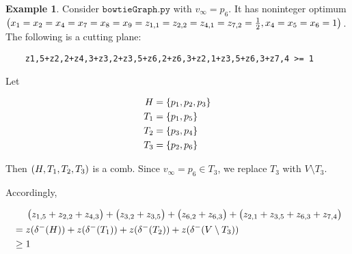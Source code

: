 \documentclass{memoir}
\theoremstyle{plain}
\theoremstyle{definition}
\newtheorem{example}{Example}
\begin{document}
\begin{example}
	Consider $\texttt{bowtieGraph.py}$ with $v_\infty = p_6$. 
	It has noninteger optimum $\del{x_1=x_2=x_4=x_7=x_8=x_9=z_{1,1}=z_{2,2}=z_{4,1}=z_{7,2} = \frac{1}{2}, x_4=x_5=x_6 = 1}$.
	The following is a cutting plane:

	\begin{verbatim}
	z1,5+z2,2+z4,3+z3,2+z3,5+z6,2+z6,3+z2,1+z3,5+z6,3+z7,4 >= 1
	\end{verbatim}

	Let

	\begin{align*}
		H &= \cbr{p_1, p_2, p_3} \\
		T_1 &= \cbr{p_1, p_5} \\
		T_2 &= \cbr{p_3, p_4} \\
		T_3 &= \cbr{p_2, p_6}
	\end{align*}

	Then $\del{H,T_1,T_2,T_3}$ is a comb. Since $v_\infty = p_6 \in T_3$, we replace
	$T_3$ with $V\setminus T_3$.  
	
	Accordingly,

	\begin{align*}
		&\phantom{{}={}} \del{z_{1,5}+z_{2,2}+z_{4,3}}+\del{z_{3,2}+z_{3,5}}+\del{z_{6,2}+z_{6,3}}+\del{z_{2,1}+z_{3,5}+z_{6,3}+z_{7,4}} \\ 
		&= z(\delta^-(H)) + z(\delta^-(T_1)) + z(\delta^-(T_2)) + z(\delta^-(V\setminus T_3)) \\
		&\geq 1
	\end{align*}

\end{example}
\end{document}

